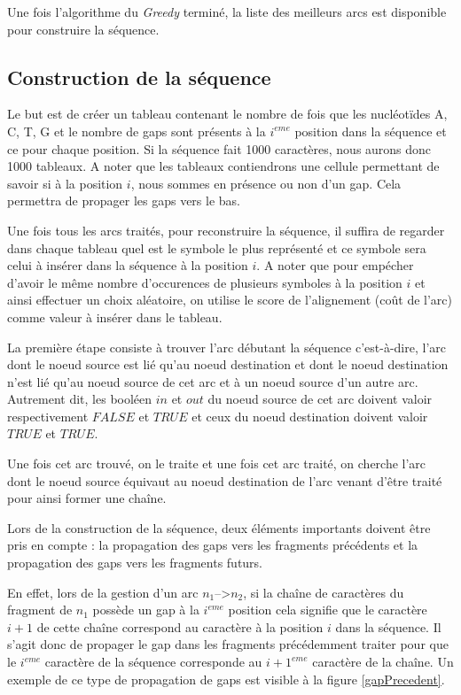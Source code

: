 \documentclass[12pt,a4paper,final]{article}
\begin{document}
Une fois l'algorithme du \textit{Greedy} terminé, la liste des meilleurs arcs est disponible pour construire la séquence.

\subsection{Construction de la séquence}

Le but est de créer un tableau contenant le nombre de fois que les nucléotïdes A, C, T, G et le nombre de gaps sont présents à la $i^{eme}$ position dans la séquence et ce pour chaque position.  Si la séquence fait 1000 caractères, nous aurons donc 1000 tableaux.  A noter que les tableaux contiendrons une cellule permettant de savoir si à la position $i$, nous sommes en présence ou non d'un gap.  Cela permettra de propager les gaps vers le bas.\medskip

Une fois tous les arcs traités, pour reconstruire la séquence, il suffira de regarder dans chaque tableau quel est le symbole le plus représenté et ce symbole sera celui à insérer dans la séquence à la position $i$.  A noter que pour empécher d'avoir le même nombre d'occurences de plusieurs symboles à la position $i$ et ainsi effectuer un choix aléatoire, on utilise le score de l'alignement (coût de l'arc) comme valeur à insérer dans le tableau.\medskip

La première étape consiste à trouver l'arc débutant la séquence c'est-à-dire, l'arc dont le noeud source est lié qu'au noeud destination et dont le noeud destination n'est lié qu'au noeud source de cet arc et à un noeud source d'un autre arc.  Autrement dit, les booléen $in$ et $out$ du noeud source de cet arc doivent valoir respectivement $FALSE$ et $TRUE$  et ceux du noeud destination doivent valoir $TRUE$ et $TRUE$.\medskip

Une fois cet arc trouvé, on le traite et une fois cet arc traité, on cherche l'arc dont le noeud source équivaut au noeud destination de l'arc venant d'être traité pour ainsi former une chaîne.\medskip

Lors de la construction de la séquence, deux éléments importants doivent être pris en compte : la propagation des gaps vers les fragments précédents et la propagation des gaps vers les fragments futurs.\medskip

En effet, lors de la gestion d'un arc $n_1$-->$n_2$, si la chaîne de caractères du fragment de $n_1$ possède un gap à la $i^{eme}$ position cela signifie que le caractère $i+1$ de cette chaîne correspond au caractère à la position $i$ dans la séquence.  Il s'agit donc de propager le gap dans les fragments précédemment traiter pour que le $i^{eme}$ caractère de la séquence corresponde au $i+1^{eme}$ caractère de la chaîne.  Un exemple de ce type de propagation de gaps est visible à la figure \ref{gapPrecedent}.\medskip
\end{document}
